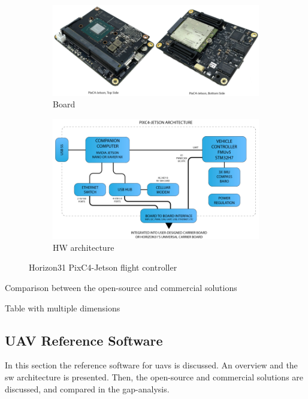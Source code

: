 \begin{figure}[htb!]
  \centering
  \begin{subfigure}[t]{0.9\textwidth}
  \includegraphics[width=1.0\textwidth]{./img/png/hw-horizon-pixc4-jetson.png} 
  \caption{Board}%
  \label{fig:hw-horizonJetson-board}
  \end{subfigure}
%
  \begin{subfigure}[t]{0.9\textwidth}
  \includegraphics[width=1.0\textwidth]{./img/png/hw-horizon-pixc4-jetson-arch.png} 
  \caption{HW architecture}%
  \label{fig:hw-horizonJetson-arch}
\end{subfigure}
%
  \caption{Horizon31 PixC4-Jetson flight controller~\cite{arduPilot-horizonJetson}}%
  \label{fig:hw-horizonJetson}
\end{figure}
%

\label{sec:gap-analysis-hw}
Comparison between the open-source and commercial solutions

Table with multiple dimensions

\subsection{UAV Reference Software}%
\label{sec:uav-ref-sw}
In this section the reference software for \glspl{uav} is discussed. An overview
and the \gls{sw} architecture is presented. Then, the open-source and
commercial solutions are discussed, and compared in the gap-analysis.


